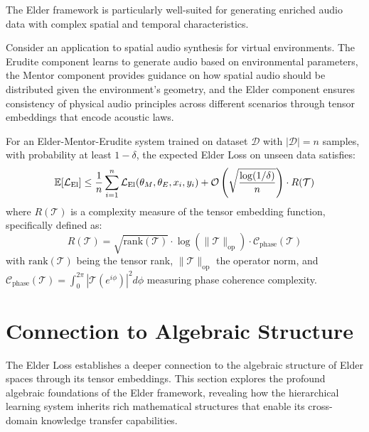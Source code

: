 The Elder framework is particularly well-suited for generating enriched audio data with complex spatial and temporal characteristics.

\begin{example}
Consider an application to spatial audio synthesis for virtual environments. The Erudite component learns to generate audio based on environmental parameters, the Mentor component provides guidance on how spatial audio should be distributed given the environment's geometry, and the Elder component ensures consistency of physical audio principles across different scenarios through tensor embeddings that encode acoustic laws.
\end{example}

\begin{theorem}
For an Elder-Mentor-Erudite system trained on dataset $\mathcal{D}$ with $|\mathcal{D}| = n$ samples, with probability at least $1-\delta$, the expected Elder Loss on unseen data satisfies:
\begin{equation}
\mathbb{E}[\mathcal{L}_{\text{El}}] \leq \frac{1}{n}\sum_{i=1}^n \mathcal{L}_{\text{El}}(\theta_M, \theta_E, x_i, y_i) + \mathcal{O}\left(\sqrt{\frac{\log(1/\delta)}{n}}\right) \cdot R(\mathcal{T})
\end{equation}
where $R(\mathcal{T})$ is a complexity measure of the tensor embedding function, specifically defined as:
\begin{equation}
R(\mathcal{T}) = \sqrt{\text{rank}(\mathcal{T})} \cdot \log(\|\mathcal{T}\|_{\text{op}}) \cdot \mathcal{C}_{\text{phase}}(\mathcal{T})
\end{equation}
with $\text{rank}(\mathcal{T})$ being the tensor rank, $\|\mathcal{T}\|_{\text{op}}$ the operator norm, and $\mathcal{C}_{\text{phase}}(\mathcal{T}) = \int_0^{2\pi} |\mathcal{T}(e^{i\phi})|^2 d\phi$ measuring phase coherence complexity.
\end{theorem}

\section{Connection to Algebraic Structure}

The Elder Loss establishes a deeper connection to the algebraic structure of Elder spaces through its tensor embeddings. This section explores the profound algebraic foundations of the Elder framework, revealing how the hierarchical learning system inherits rich mathematical structures that enable its cross-domain knowledge transfer capabilities.

